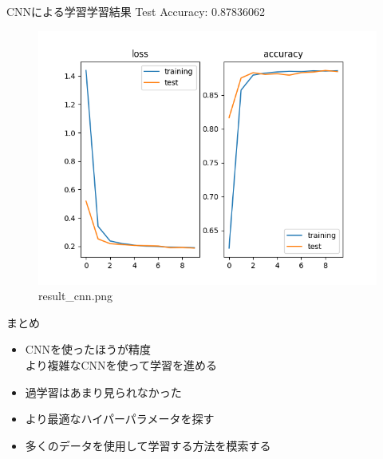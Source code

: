 \documentclass[dvipdfmx]{beamer}
\begin{document}
  \begin{frame}{CNNによる学習学習結果}
    Test Accuracy: 0.87836062
    \begin{figure}[H]
      \centering
      \includegraphics[keepaspectratio, scale=0.5]{images/train_cnn.png}
      \caption{result\_cnn.png}
    \end{figure}
  \end{frame}

  \begin{frame}{まとめ}
    \begin{itemize}
      \item CNNを使ったほうが精度\mbox{}\\
        より複雑なCNNを使って学習を進める
      \item 過学習はあまり見られなかった
      \item より最適なハイパーパラメータを探す
      \item 多くのデータを使用して学習する方法を模索する
    \end{itemize}
  \end{frame}
\end{document}
